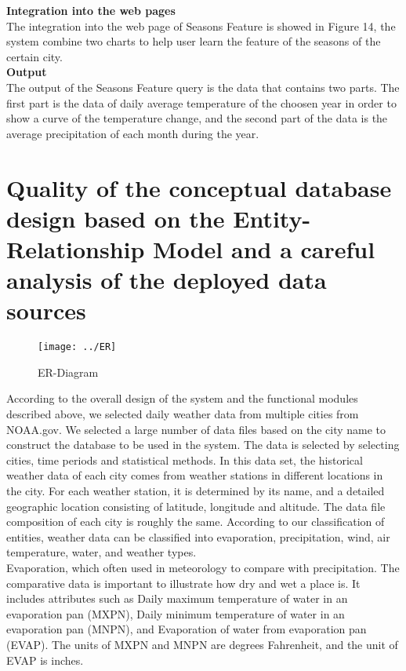 \documentclass[]{article}
\begin{document}
	\noindent \textbf{Integration into the web pages} \\
	\noindent The integration into the web page of Seasons Feature is showed in Figure 14, the system combine two charts to help user learn the feature of the seasons of the certain city.    \\
	
	\noindent \textbf{Output} \\
	\noindent The output of the Seasons Feature query is the data that contains two parts. The first part is the data of daily average temperature of the choosen year in order to show a curve of the temperature change, and the second part of the data is the average precipitation of each month during the year.
	
	\section{Quality of the conceptual database design based on the Entity-Relationship Model and a careful analysis of the deployed data sources}
	
	\begin{figure}[H]
		\centering
		\texttt{[image: ../ER]}
		\caption{ER-Diagram}
		\label{fig:er}
	\end{figure}
	
	According to the overall design of the system and the functional modules described above, we selected daily weather data from multiple cities from NOAA.gov. We selected a large number of data files based on the city name to construct the database to be used in the system. The data is selected by selecting cities, time periods and statistical methods. In this data set, the historical weather data of each city comes from weather stations in different locations in the city. For each weather station, it is determined by its name, and a detailed geographic location consisting of latitude, longitude and altitude. The data file composition of each city is roughly the same. According to our classification of entities, weather data can be classified into evaporation, precipitation, wind, air temperature, water, and weather types. \\
	
	\noindent Evaporation, which often used in meteorology to compare with precipitation. The comparative data is important to illustrate how dry and wet a place is. It includes attributes such as Daily maximum temperature of water in an evaporation pan (MXPN), Daily minimum temperature of water in an evaporation pan (MNPN), and Evaporation of water from evaporation pan (EVAP). The units of MXPN and MNPN are degrees Fahrenheit, and the unit of EVAP is inches. \\
	
\end{document}
